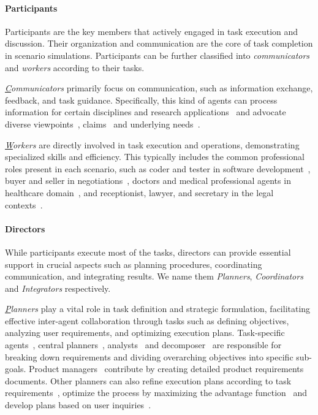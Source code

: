 \paragraph{Participants} 

Participants are the key members that actively engaged in task execution and discussion.
Their organization and communication are the core of task completion in scenario simulations.
Participants can be further classified into \textit{communicators} and \textit{workers} according to their tasks.

\textit{{\ul Communicators}} primarily focus on communication, such as information exchange, feedback, and task guidance. Specifically, this kind of agents can process information for certain disciplines and research applications~\cite{hamilton2023blind,nair2023dera} and advocate diverse viewpoints~\cite{xiong2023examining,hao2023chatllm}, claims~\cite{liang2023encouraging} and underlying needs~\cite{ataei2024elicitron,li2024culturepark}. 

\textit{{\ul Workers}} are directly involved in task execution and operations, demonstrating specialized skills and efficiency. This typically includes the common professional roles present in each scenario, such as coder and tester in software development~\cite{dong2023self}, buyer and seller in negotiations~\cite{fu2023improving}, doctors and medical professional agents in healthcare domain~\cite{wu2023large,li2024agent}, and receptionist, lawyer, and secretary in the legal contexts~\cite{sun2024lawluo}.


\paragraph{Directors}

While participants execute most of the tasks, directors can provide essential support in crucial aspects such as planning procedures, coordinating communication, and integrating results.
We name them \textit{Planners}, \textit{Coordinators} and \textit{Integrators} respectively.

\textit{{\ul Planners}} play a vital role in task definition and strategic formulation, facilitating effective inter-agent collaboration through tasks such as defining objectives, analyzing user requirements, and optimizing execution plans. Task-specific agents~\cite{li2023camel}, central planners~\cite{chen2023agentverse}, analysts~\cite{dong2023self} and decomposer~\cite{zhu2023ghost} are responsible for breaking down requirements and dividing overarching objectives into specific sub-goals. Product managers~\cite{hong2023metagpt} contribute by creating detailed product requirements documents. Other planners can also refine execution plans according to task requirements~\cite{chen2024scalable}, optimize the process by maximizing the advantage function~\cite{chen2024s} and develop plans based on user inquiries~\cite{zhuautotqa}.

